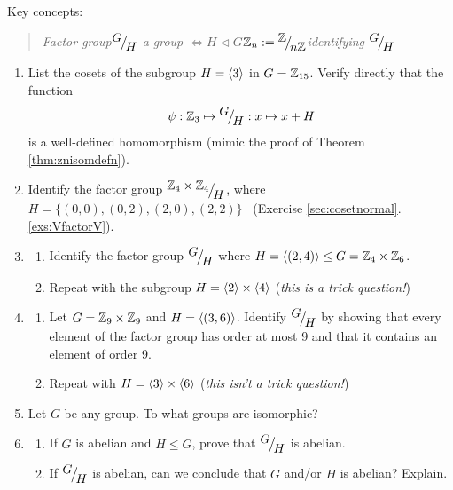 \begin{exercises}
	Key concepts:
	\begin{quote}
		\emph{Factor group\qquad ${}^{\textstyle {G}}\!\big/_{\textstyle \!{H}}$ a group $\iff H\triangleleft G$\qquad $\mathbb{Z}_n:={}^{\textstyle {\mathbb{Z}}}\!\big/_{\textstyle \!{n\mathbb{Z}}}$\qquad identifying ${}^{\textstyle {G}}\!\big/_{\textstyle \!{H}}$}
	\end{quote}
	
	\begin{enumerate}
	  \item List the cosets of the subgroup $H=\left\langle 3\right\rangle$ in $G=\mathbb{Z}_{15}$. Verify directly that the function
	  \[
	  	\psi:\mathbb{Z}_3\mapsto {}^{\textstyle {G}}\!\big/_{\textstyle \!{H}}:x\mapsto x+H
	  \]
	  is a well-defined homomorphism (mimic the proof of Theorem \ref{thm:znisomdefn}).
	
		
		\item Identify the factor group ${}^{\textstyle {\mathbb{Z}_4\times\mathbb{Z}_4}}\!\big/_{\textstyle \!{H}}$, where $H=\bigl\{(0,0),(0,2),(2,0),(2,2)\bigr\}$ \ (Exercise \ref*{sec:cosetnormal}.\ref{exs:VfactorV}).
		
		
		\item\begin{enumerate}
		  \item Identify the factor group ${}^{\textstyle {G}}\!\big/_{\textstyle \!{H}}$ where $H=\left\langle (2,4)\right\rangle\le G=\mathbb{Z}_4\times\mathbb{Z}_6$.
		  \item Repeat with the subgroup $H=\left\langle 2\right\rangle\times\left\langle 4\right\rangle$ (\emph{this is a trick question!})
		\end{enumerate}
		
		
		\item\begin{enumerate}
		  \item Let $G=\mathbb{Z}_9\times\mathbb{Z}_9$ and $H=\left\langle (3,6)\right\rangle$. Identify ${}^{\textstyle {G}}\!\big/_{\textstyle \!{H}}$ by showing that every element of the factor group has order at most 9 and that it contains an element of order 9.
		  
		  \item Repeat with $H=\left\langle 3\right\rangle\times\left\langle 6\right\rangle$ (\emph{this isn't a trick question!})
		\end{enumerate}
	  
	  
		\item Let $G$ be any group. To what groups are  isomorphic?
		
	
		\item\label{exs:gmodhabelian}\begin{enumerate}
		  \item If $G$ is abelian and $H\le G$, prove that $\smash[b]{{}^{\textstyle {G}}\!\big/_{\textstyle \!{H}}}$ is abelian.
		  
		  \item If ${}^{\textstyle {G}}\!\big/_{\textstyle \!{H}}$ is abelian, can we conclude that $G$ and/or $H$ is abelian? Explain.
		\end{enumerate}
		

\end{enumerate}
\end{exercises}
